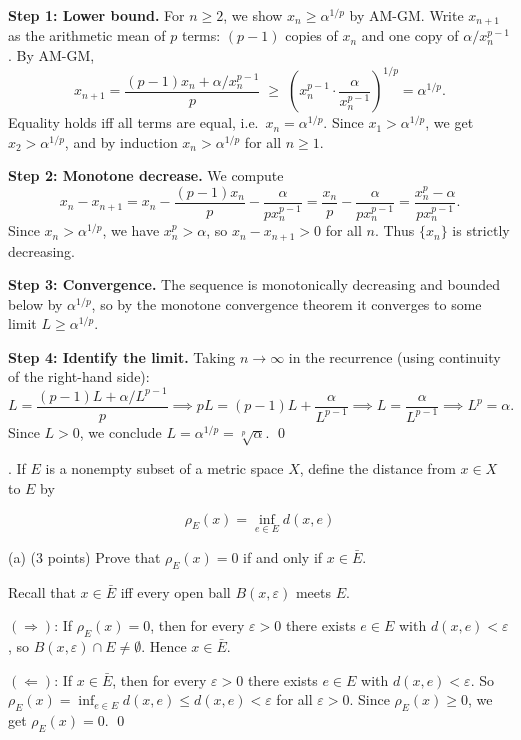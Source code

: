 \documentclass[10pt]{article}
\newcommand{\eps}{\varepsilon}
\newenvironment{solution}{%
  \par\medskip\noindent{\color{red}\textbf{Solution.}}\color{red}\;}%
  {\par\medskip}
\begin{document}
\begin{solution}
\textbf{Step 1: Lower bound.} For $n \geq 2$, we show $x_n \geq \alpha^{1/p}$ by AM-GM. Write $x_{n+1}$ as the arithmetic mean of $p$ terms: $(p-1)$ copies of $x_n$ and one copy of $\alpha/x_n^{p-1}$. By AM-GM,
$$
x_{n+1} = \frac{(p-1)x_n + \alpha/x_n^{p-1}}{p} \;\geq\; \left(x_n^{p-1} \cdot \frac{\alpha}{x_n^{p-1}}\right)^{1/p} = \alpha^{1/p}.
$$
Equality holds iff all terms are equal, i.e.\ $x_n = \alpha^{1/p}$. Since $x_1 > \alpha^{1/p}$, we get $x_2 > \alpha^{1/p}$, and by induction $x_n > \alpha^{1/p}$ for all $n \geq 1$.

\textbf{Step 2: Monotone decrease.} We compute
$$
x_n - x_{n+1} = x_n - \frac{(p-1)x_n}{p} - \frac{\alpha}{px_n^{p-1}} = \frac{x_n}{p} - \frac{\alpha}{px_n^{p-1}} = \frac{x_n^p - \alpha}{px_n^{p-1}}.
$$
Since $x_n > \alpha^{1/p}$, we have $x_n^p > \alpha$, so $x_n - x_{n+1} > 0$ for all $n$. Thus $\{x_n\}$ is strictly decreasing.

\textbf{Step 3: Convergence.} The sequence is monotonically decreasing and bounded below by $\alpha^{1/p}$, so by the monotone convergence theorem it converges to some limit $L \geq \alpha^{1/p}$.

\textbf{Step 4: Identify the limit.} Taking $n\to\infty$ in the recurrence (using continuity of the right-hand side):
$$
L = \frac{(p-1)L + \alpha/L^{p-1}}{p} \implies pL = (p-1)L + \frac{\alpha}{L^{p-1}} \implies L = \frac{\alpha}{L^{p-1}} \implies L^p = \alpha.
$$
Since $L > 0$, we conclude $L = \alpha^{1/p} = \sqrt[p]{\alpha}$. \qed
\end{solution}
\clearpage
. If $E$ is a nonempty subset of a metric space $X$, define the distance from $x \in X$ to $E$ by

$$
\rho_{E}(x)=\inf _{e \in E} d(x, e)
$$

(a) (3 points) Prove that $\rho_{E}(x)=0$ if and only if $x \in \bar{E}$.

\begin{solution}
Recall that $x \in \bar{E}$ iff every open ball $B(x,\eps)$ meets $E$.

$(\Rightarrow)$: If $\rho_E(x) = 0$, then for every $\eps > 0$ there exists $e \in E$ with $d(x,e) < \eps$, so $B(x,\eps) \cap E \neq \emptyset$. Hence $x \in \bar{E}$.

$(\Leftarrow)$: If $x \in \bar{E}$, then for every $\eps > 0$ there exists $e \in E$ with $d(x,e) < \eps$. So $\rho_E(x) = \inf_{e \in E} d(x,e) \leq d(x,e) < \eps$ for all $\eps > 0$. Since $\rho_E(x) \geq 0$, we get $\rho_E(x) = 0$. \qed
\end{solution}
\end{document}
